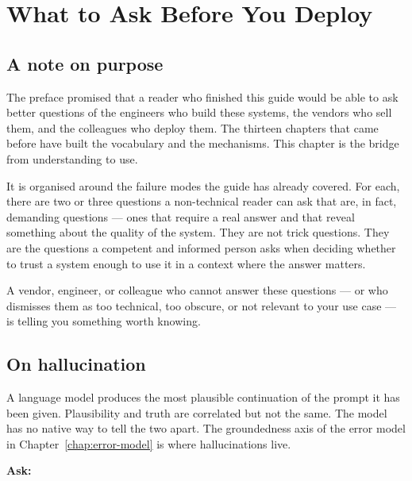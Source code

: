 
\chapter{What to Ask Before You Deploy}
\label{chap:what-to-ask}
\label{ntg:ch14}

\section*{A note on purpose}

The preface promised that a reader who finished this guide
would be able to ask better questions of the engineers who
build these systems, the vendors who sell them, and the
colleagues who deploy them. The thirteen chapters that
came before have built the vocabulary and the mechanisms.
This chapter is the bridge from understanding to use.

It is organised around the failure modes the guide has
already covered. For each, there are two or three questions
a non-technical reader can ask that are, in fact, demanding
questions --- ones that require a real answer and that reveal
something about the quality of the system. They are not
trick questions. They are the questions a competent and
informed person asks when deciding whether to trust a system
enough to use it in a context where the answer matters.

A vendor, engineer, or colleague who cannot answer these
questions --- or who dismisses them as too technical, too
obscure, or not relevant to your use case --- is telling
you something worth knowing.

\section{On hallucination}

A language model produces the most plausible continuation
of the prompt it has been given. Plausibility and truth are
correlated but not the same. The model has no native way to
tell the two apart. The groundedness axis of the error model
in Chapter~\ref{chap:error-model} is where hallucinations live.

\medskip
\noindent\textbf{Ask:}

